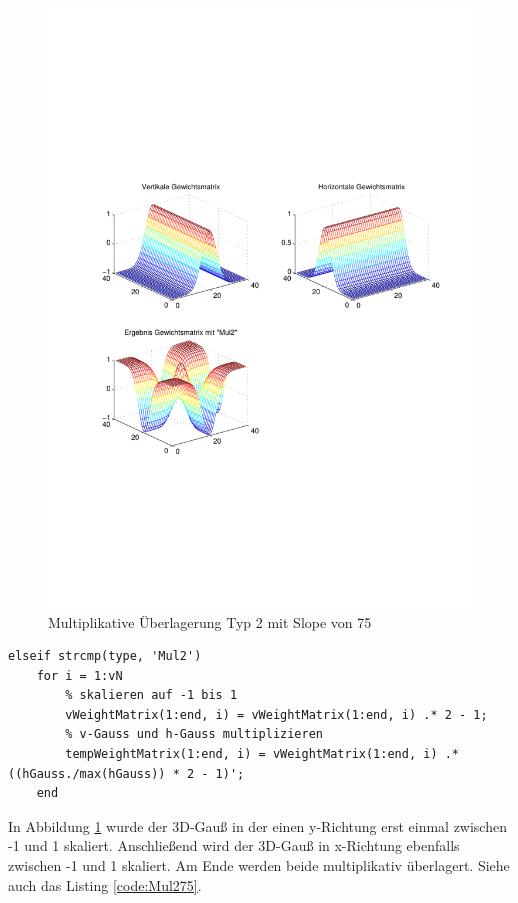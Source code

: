 \newpage
\begin{figure}[hbt]
	\centering
	\includegraphics[width=1\linewidth]{./Bilder/Auswertung/GewichtmatrixEinzelschritte/Endergebnis_Gewichtsmatrix_Slope_75_Type_Mul2}
	\caption{Multiplikative Überlagerung Typ 2 mit Slope von 75}
	\label{Mul275}
\end{figure}

\begin{lstlisting}[label=code:Mul275, caption=Auszug Matlab-Skript 'GetGaussWeights()']
elseif strcmp(type, 'Mul2')
	for i = 1:vN
		% skalieren auf -1 bis 1
		vWeightMatrix(1:end, i) = vWeightMatrix(1:end, i) .* 2 - 1;
		% v-Gauss und h-Gauss multiplizieren
		tempWeightMatrix(1:end, i) = vWeightMatrix(1:end, i) .* ((hGauss./max(hGauss)) * 2 - 1)';
	end
\end{lstlisting}

In Abbildung \ref{Mul275} wurde der 3D-Gauß in der einen y-Richtung erst einmal zwischen -1 und 1 skaliert. Anschließend wird der 3D-Gauß in x-Richtung ebenfalls zwischen -1 und 1 skaliert. Am Ende werden beide multiplikativ überlagert. Siehe auch das Listing \ref{code:Mul275}.


